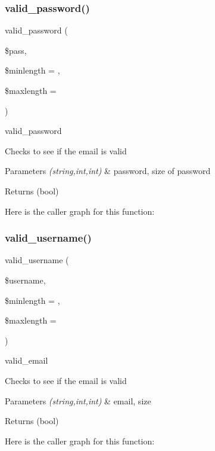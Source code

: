 \subsubsection{\texorpdfstring{valid\+\_\+password()}{valid\_password()}}
{\footnotesize\ttfamily valid\+\_\+password (\begin{DoxyParamCaption}\item[{}]{\$pass,  }\item[{}]{\$minlength = {},  }\item[{}]{\$maxlength = {} }\end{DoxyParamCaption})}

valid\+\_\+password

Checks to see if the email is valid


\begin{DoxyParams}{Parameters}
{\em (string,int,int)} & password, size of password \\
\hline
\end{DoxyParams}
\begin{DoxyReturn}{Returns}
(bool) 
\end{DoxyReturn}
Here is the caller graph for this function\+:
\mbox{\label{validation_8functions_8inc_8php_adbefc0e701b0003953545b3fc3202417}} 
\subsubsection{\texorpdfstring{valid\+\_\+username()}{valid\_username()}}
{\footnotesize\ttfamily valid\+\_\+username (\begin{DoxyParamCaption}\item[{}]{\$username,  }\item[{}]{\$minlength = {},  }\item[{}]{\$maxlength = {} }\end{DoxyParamCaption})}

valid\+\_\+email

Checks to see if the email is valid


\begin{DoxyParams}{Parameters}
{\em (string,int,int)} & email, size \\
\hline
\end{DoxyParams}
\begin{DoxyReturn}{Returns}
(bool) 
\end{DoxyReturn}
Here is the caller graph for this function\+:
